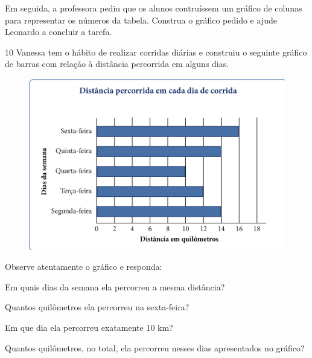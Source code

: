 Em seguida, a professora pediu que os alunos contruíssem um gráfico de
colunas para representar os números da tabela. Construa o gráfico pedido
e ajude Leonardo a concluir a tarefa.

\begin{mdframed}[linewidth=2pt,linecolor=salmao]
\vspace{13cm}
\end{mdframed}

\pagebreak

\num{10} Vanessa tem o hábito de realizar corridas diárias e construiu o
seguinte gráfico de barras com relação à distância percorrida em alguns dias.

\begin{figure}[htpb!]
\centering
\includegraphics[width=\textwidth]{../ilustracoes/MAT5/SAEB_5ANO_MAT_figura63.png}
\end{figure}

Observe atentamente o gráfico e responda:

\begin{escolha}
\item
  Em quais dias da semana ela percorreu a mesma distância?


\item
  Quantos quilômetros ela percorreu na sexta-feira?


\item
  Em que dia ela percorreu exatamente 10 km?


\item
  Quantos quilômetros, no total, ela percorreu nesses dias apresentados no gráfico?

\end{escolha}

